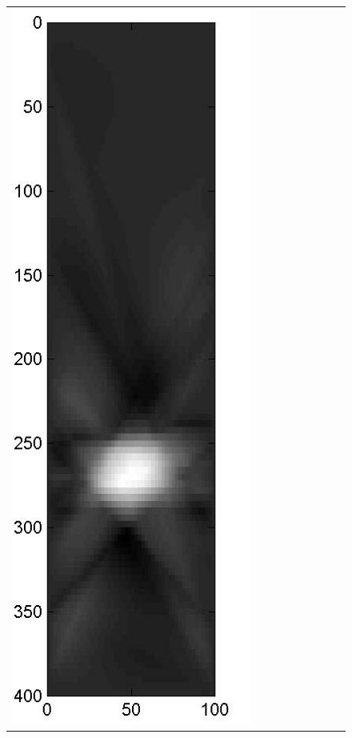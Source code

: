 \documentclass[11pt]{article}
\begin{document}
\begin{figure}[!h]
\begin{center}
\begin{tabular}{|c|c|c|c|c|c|c|c|c|}
			\includegraphics[width=.9\iwidth]{figures/newFigs/noisy/resultsExp-6-mk}
			&

\end{tabular}
\end{center}
\end{figure}
\end{document}
